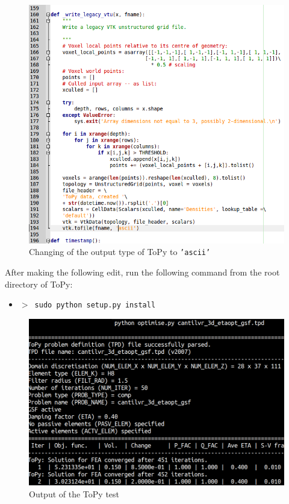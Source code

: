 \documentclass[
12pt, %
a4paper, %
oneside, %
headinclude,footinclude, %
BCOR5mm, %
]{scrartcl}
\begin{document}
\begin{figure}
\centering
\includegraphics[scale=0.5]{img/ToPy_CodeChange.png}
\caption{Changing of the output type of ToPy to \texttt{'ascii'}}
\label{fig:ToPy_CodeChange}
\end{figure}

After making the following edit, run the following command from the root directory of ToPy:
\begin{itemize}
\item[] \texttt{\textbf{$>$ }sudo python setup.py install}
\end{itemize}

\begin{figure}
\centering
\includegraphics[scale=0.3]{img/ToPy_ExampleRun_cut.png}
\caption{Output of the ToPy test}
\label{fig:ToPy_test}
\end{figure}
\end{document}
